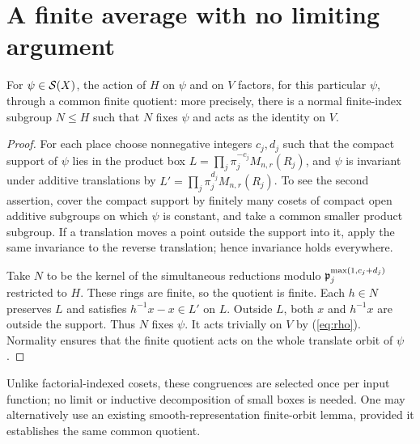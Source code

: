 \documentclass[11pt,letterpaper]{article}
\begin{document}
\section{A finite average with no limiting argument}
\begin{lemma}\label{lem:finite}
For $\psi\in\mathcal S(X)$, the action of $H$ on $\psi$ and on $V$ factors, for this particular $\psi$, through a common finite quotient: more precisely, there is a normal finite-index subgroup $N\le H$ such that $N$ fixes $\psi$ and acts as the identity on $V$.
\end{lemma}
\begin{proof}
For each place choose nonnegative integers $c_j,d_j$ such that the compact support of $\psi$ lies in the product box $L=\prod_j \pi_j^{-c_j}M_{n,r}(R_j)$, and $\psi$ is invariant under additive translations by $L'=\prod_j \pi_j^{d_j}M_{n,r}(R_j)$. To see the second assertion, cover the compact support by finitely many cosets of compact open additive subgroups on which $\psi$ is constant, and take a common smaller product subgroup. If a translation moves a point outside the support into it, apply the same invariance to the reverse translation; hence invariance holds everywhere.

Take $N$ to be the kernel of the simultaneous reductions modulo $\mathfrak p_j^{\max(1,c_j+d_j)}$ restricted to $H$. These rings are finite, so the quotient is finite. Each $h\in N$ preserves $L$ and satisfies $h^{-1}x-x\in L'$ on $L$. Outside $L$, both $x$ and $h^{-1}x$ are outside the support. Thus $N$ fixes $\psi$. It acts trivially on $V$ by (\ref{eq:rho}). Normality ensures that the finite quotient acts on the whole translate orbit of $\psi$.
\end{proof}
Unlike factorial-indexed cosets, these congruences are selected once per input function; no limit or inductive decomposition of small boxes is needed. One may alternatively use an existing smooth-representation finite-orbit lemma, provided it establishes the same common quotient.
\end{document}
